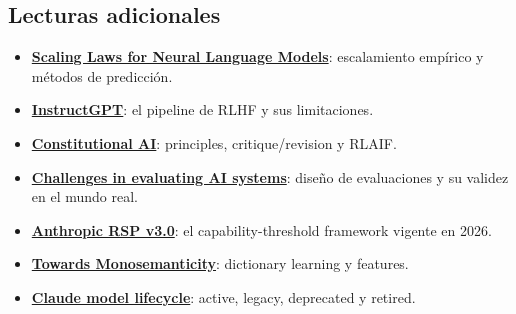 \documentclass[a4paper]{article}
\begin{document}
\subsection{Lecturas adicionales}

{\small
\begin{itemize}[nosep,leftmargin=*]
  \item \href{https://arxiv.org/abs/2001.08361}{\textbf{Scaling Laws for Neural Language Models}}: escalamiento empírico y métodos de predicción.
  \item \href{https://arxiv.org/abs/2203.02155}{\textbf{InstructGPT}}: el pipeline de RLHF y sus limitaciones.
  \item \href{https://www.anthropic.com/research/constitutional-ai-harmlessness-from-ai-feedback}{\textbf{Constitutional AI}}: principles, critique/revision y RLAIF.
  \item \href{https://www.anthropic.com/research/evaluating-ai-systems}{\textbf{Challenges in evaluating AI systems}}: diseño de evaluaciones y su validez en el mundo real.
  \item \href{https://www.anthropic.com/responsible-scaling-policy/rsp-v3-0}{\textbf{Anthropic RSP v3.0}}: el capability-threshold framework vigente en 2026.
  \item \href{https://www.anthropic.com/research/towards-monosemanticity-decomposing-language-models-with-dictionary-learning}{\textbf{Towards Monosemanticity}}: dictionary learning y features.
  \item \href{https://docs.anthropic.com/en/docs/about-claude/model-deprecations}{\textbf{Claude model lifecycle}}: active, legacy, deprecated y retired.
\end{itemize}
}
\end{document}
